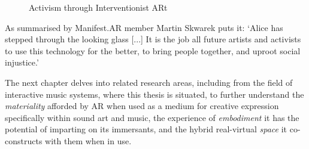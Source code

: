 \begin{figure}
    \centering
    \caption{Activism through Interventionist ARt}
    \label{fig: activismARt}
\end{figure}


As summarised by Manifest.AR member Martin Skwarek puts it: `Alice has stepped through the looking glass [...] It is the job all future artists and activists to use this technology for the better, to bring people together, and uproot social injustice.' \citeyearpar{skwarek2018}

The next chapter delves into related research areas, including from the field of interactive music systems, where this thesis is situated, to further understand the \textit{materiality} afforded by AR when used as a medium for creative expression specifically within sound art and music, the experience of \textit{embodiment} it has the potential of imparting on its immersants, and the hybrid real-virtual \textit{space} it co-constructs with them when in use.

